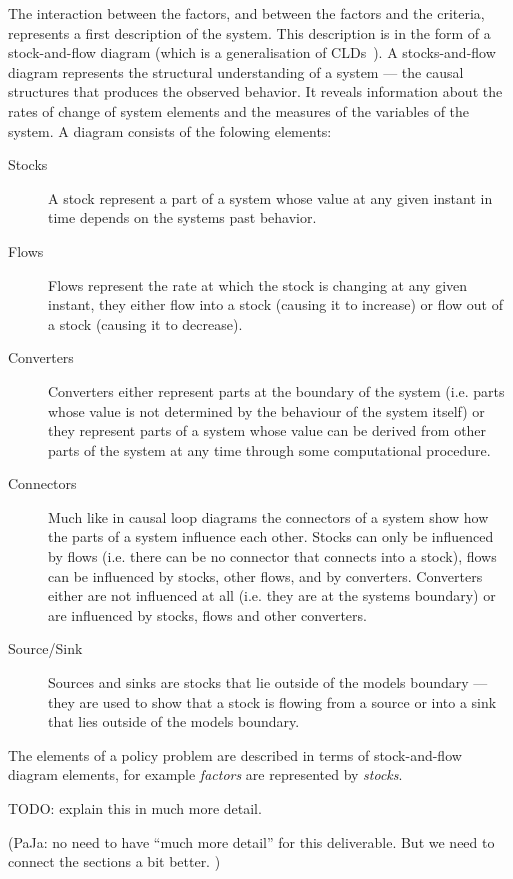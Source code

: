 The interaction between the factors, and between the factors and the
criteria, represents a first description of the system.
%
This description is in the form of a stock-and-flow diagram (which is
a generalisation of \aclp{CLD}~\cite{burns}).
%
A stocks-and-flow diagram represents the structural understanding of a
system --- the causal structures that produces the observed behavior.
%
It reveals information about the rates of change of system elements
and the measures of the variables of the system.
%
A diagram consists of the folowing elements:
\begin{description}
\item[Stocks] A stock represent a part of a system whose value at any
  given instant in time depends on the systems past behavior.
\item[Flows] Flows represent the rate at which the stock is changing
  at any given instant, they either flow into a stock (causing it to
  increase) or flow out of a stock (causing it to decrease).
\item[Converters] Converters either represent parts at the boundary of
  the system (i.e. parts whose value is not determined by the
  behaviour of the system itself) or they represent parts of a system
  whose value can be derived from other parts of the system at any
  time through some computational procedure.
\item[Connectors] Much like in causal loop diagrams the connectors of
  a system show how the parts of a system influence each other.
%
  Stocks can only be influenced by flows (i.e. there can be no
  connector that connects into a stock), flows can be influenced by
  stocks, other flows, and by converters.
%
  Converters either are not influenced at all (i.e. they are at the
  systems boundary) or are influenced by stocks, flows and other
  converters.
\item[Source/Sink] Sources and sinks are stocks that lie outside of
  the models boundary --- they are used to show that a stock is
  flowing from a source or into a sink that lies outside of the models
  boundary.
\end{description}
The elements of a policy problem are described in terms of
stock-and-flow diagram elements, for example \emph{factors} are
represented by \emph{stocks}.

TODO: explain this in much more detail.

(PaJa: no need to have ``much more detail'' for this deliverable. But
we need to connect the sections a bit better. )

